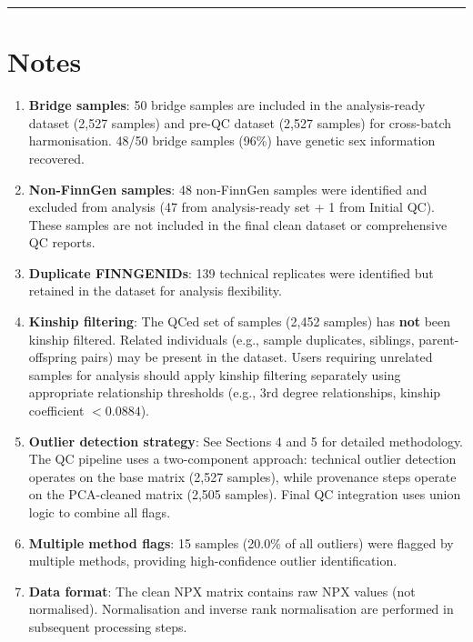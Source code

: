 \documentclass[11pt,a4paper]{article}
\begin{document}
\vspace{0.5cm}
\noindent\rule{\linewidth}{0.5pt}
\vspace{0.5cm}

\section{Notes}

\begin{enumerate}
\item \textbf{Bridge samples}: 50 bridge samples are included in the analysis-ready dataset (2,527 samples) and pre-QC dataset (2,527 samples) for cross-batch harmonisation. 48/50 bridge samples (96\%) have genetic sex information recovered.

\item \textbf{Non-FinnGen samples}: 48 non-FinnGen samples were identified and excluded from analysis (47 from analysis-ready set + 1 from Initial QC). These samples are not included in the final clean dataset or comprehensive QC reports.

\item \textbf{Duplicate FINNGENIDs}: 139 technical replicates were identified but retained in the dataset for analysis flexibility.

\item \textbf{Kinship filtering}: The QCed set of samples (2,452 samples) has \textbf{not} been kinship filtered. Related individuals (e.g., sample duplicates, siblings, parent-offspring pairs) may be present in the dataset. Users requiring unrelated samples for analysis should apply kinship filtering separately using appropriate relationship thresholds (e.g., 3rd degree relationships, kinship coefficient $< 0.0884$).

\item \textbf{Outlier detection strategy}: See Sections 4 and 5 for detailed methodology. The QC pipeline uses a two-component approach: technical outlier detection operates on the base matrix (2,527 samples), while provenance steps operate on the PCA-cleaned matrix (2,505 samples). Final QC integration uses union logic to combine all flags.

\item \textbf{Multiple method flags}: 15 samples (20.0\% of all outliers) were flagged by multiple methods, providing high-confidence outlier identification.

\item \textbf{Data format}: The clean NPX matrix contains raw NPX values (not normalised). Normalisation and inverse rank normalisation are performed in subsequent processing steps.


\end{enumerate}
\end{document}
